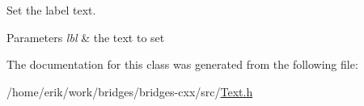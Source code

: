 Set the label text. 


\begin{DoxyParams}{Parameters}
{\em lbl} & the text to set \\
\hline
\end{DoxyParams}


The documentation for this class was generated from the following file\+:\begin{DoxyCompactItemize}
\item 
/home/erik/work/bridges/bridges-\/cxx/src/\hyperlink{_text_8h}{Text.\+h}\end{DoxyCompactItemize}
